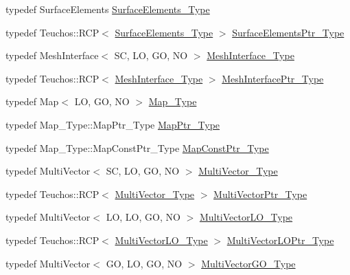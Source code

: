 \begin{DoxyCompactItemize}
\item 
typedef Surface\+Elements \hyperlink{classFEDD_1_1ErrorEstimation_a0d0800ed536b01a9a4873d0b3508d97a}{Surface\+Elements\+\_\+\+Type}
\item 
typedef Teuchos\+::\+R\+CP$<$ \hyperlink{classFEDD_1_1ErrorEstimation_a0d0800ed536b01a9a4873d0b3508d97a}{Surface\+Elements\+\_\+\+Type} $>$ \hyperlink{classFEDD_1_1ErrorEstimation_a391a95553efe67657e031e1af4ec02cc}{Surface\+Elements\+Ptr\+\_\+\+Type}
\item 
typedef Mesh\+Interface$<$ SC, LO, GO, NO $>$ \hyperlink{classFEDD_1_1ErrorEstimation_a11fff10f0a859ff6a2bef01b0ac73943}{Mesh\+Interface\+\_\+\+Type}
\item 
typedef Teuchos\+::\+R\+CP$<$ \hyperlink{classFEDD_1_1ErrorEstimation_a11fff10f0a859ff6a2bef01b0ac73943}{Mesh\+Interface\+\_\+\+Type} $>$ \hyperlink{classFEDD_1_1ErrorEstimation_aa6871369b5b28e20aac7c7178cdde50e}{Mesh\+Interface\+Ptr\+\_\+\+Type}
\item 
typedef Map$<$ LO, GO, NO $>$ \hyperlink{classFEDD_1_1ErrorEstimation_a94d0ce98d9e797cc35769bda8d3ef9fc}{Map\+\_\+\+Type}
\item 
typedef Map\+\_\+\+Type\+::\+Map\+Ptr\+\_\+\+Type \hyperlink{classFEDD_1_1ErrorEstimation_aaa2f9c22726907f5403cdeb0261b67fd}{Map\+Ptr\+\_\+\+Type}
\item 
typedef Map\+\_\+\+Type\+::\+Map\+Const\+Ptr\+\_\+\+Type \hyperlink{classFEDD_1_1ErrorEstimation_ad45c898ab6123b9e7d5efbc0e5365ccf}{Map\+Const\+Ptr\+\_\+\+Type}
\item 
typedef Multi\+Vector$<$ SC, LO, GO, NO $>$ \hyperlink{classFEDD_1_1ErrorEstimation_a1c6fa9610a1e5e887e5a88ab33f1c792}{Multi\+Vector\+\_\+\+Type}
\item 
typedef Teuchos\+::\+R\+CP$<$ \hyperlink{classFEDD_1_1ErrorEstimation_a1c6fa9610a1e5e887e5a88ab33f1c792}{Multi\+Vector\+\_\+\+Type} $>$ \hyperlink{classFEDD_1_1ErrorEstimation_a5882ff373bf8c409b407b4fd1f42bda0}{Multi\+Vector\+Ptr\+\_\+\+Type}
\item 
typedef Multi\+Vector$<$ LO, LO, GO, NO $>$ \hyperlink{classFEDD_1_1ErrorEstimation_aabbb5539b0703f8c6c04fb6595397631}{Multi\+Vector\+L\+O\+\_\+\+Type}
\item 
typedef Teuchos\+::\+R\+CP$<$ \hyperlink{classFEDD_1_1ErrorEstimation_aabbb5539b0703f8c6c04fb6595397631}{Multi\+Vector\+L\+O\+\_\+\+Type} $>$ \hyperlink{classFEDD_1_1ErrorEstimation_a00ba9c6b6b8c876b403e9c3a3c036151}{Multi\+Vector\+L\+O\+Ptr\+\_\+\+Type}
\item 
typedef Multi\+Vector$<$ GO, LO, GO, NO $>$ \hyperlink{classFEDD_1_1ErrorEstimation_a450a5b3954044f55167783097b934bbd}{Multi\+Vector\+G\+O\+\_\+\+Type}

\end{DoxyCompactItemize}
